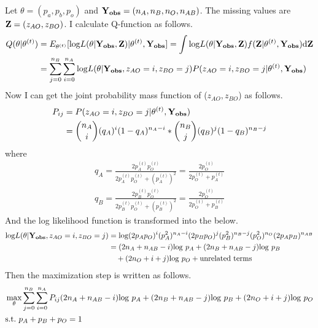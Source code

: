 \documentclass{article}
\begin{document}
	\subsection{}
		Let $\theta = (p_a, p_b, p_o)$ and ${\bf Y_{obs}} = (n_A, n_B, n_O, n_{AB})$. The missing values are ${\bf Z} = (z_{AO}, z_{BO})$. I calculate Q-function as follows.
		\begin{align}
			Q(\theta | \theta^{(t)}) &= E_{\theta^{(t)}} [{\rm log} L(\theta | {\bf Y_{obs}}, {\bf Z}) | \theta^{(t)}, {\bf Y_{obs}}]
			=  \int {\rm log} L(\theta | {\bf Y_{obs}}, {\bf Z}) f({\bf Z} | \theta^{(t)}, {\bf Y_{obs}}) \mathrm{d} {\bf Z} \nonumber \\
			&= \sum_{j = 0}^{n_{B}} \sum_{i = 0}^{n_{A}} {\rm log} L(\theta | {\bf Y_{obs}}, z_{AO} = i, z_{BO} = j) P(z_{AO} = i, z_{BO} = j | \theta^{(t)}, {\bf Y_{obs}})
		\end{align}
		Now I can get the joint probability mass function of ($z_{AO}, z_{BO}$) as follows.
		\begin{align*}
			P_{ij} &= P(z_{AO} = i, z_{BO} = j | \theta^{(t)}, {\bf Y_{obs}}) \\
			&= \binom{n_A}{i} (q_A)^i (1-q_A)^{n_A - i} *  \binom{n_B}{j} (q_B)^j (1-q_B)^{n_B - j}
		\end{align*}
		where
		\begin{align*}
			q_A = \frac{2p_A^{(t)} p_O^{(t)}}{2p_A^{(t)} p_O^{(t)} + (p_A^{(t)})^2} = \frac{2p_O^{(t)}}{2p_O^{(t)} + p_A^{(t)}} \\[10pt]
			q_B = \frac{2p_B^{(t)} p_O^{(t)}}{2p_B^{(t)} p_O^{(t)} + (p_B^{(t)})^2} = \frac{2p_O^{(t)}}{2p_O^{(t)} + p_B^{(t)}}
		\end{align*}
		And the log likelihood function is transformed into the below.
		\begin{align*}
			{\rm log} L(\theta | {\bf Y_{obs}}, z_{AO} = i, z_{BO} = j) &= {\rm log} (2p_A p_O)^i (p_A^2)^{n_A - i} (2p_Bp_O)^j (p_B^2)^{n_B - j} (p_O^2)^{n_O} (2p_A p_B)^{n_{AB}}\\
			&= (2n_A + n_{AB} - i) {\rm log}\ p_A + (2n_B + n_{AB} - j) {\rm log}\ p_B \\&\quad + (2n_O + i + j) {\rm log}\ p_O + \text{unrelated terms}
		\end{align*}
		Then the maximization step is written as follows.
		\begin{align*}
			&\max_{\theta} \sum_{j = 0}^{n_{B}} \sum_{i = 0}^{n_{A}} P_{ij} (2n_A + n_{AB} - i) {\rm log}\ p_A + (2n_B + n_{AB} - j) {\rm log}\ p_B + (2n_O + i + j) {\rm log}\ p_O \\
			&\text{s.t.}\ p_A + p_B + p_O = 1
		\end{align*}
\end{document}
